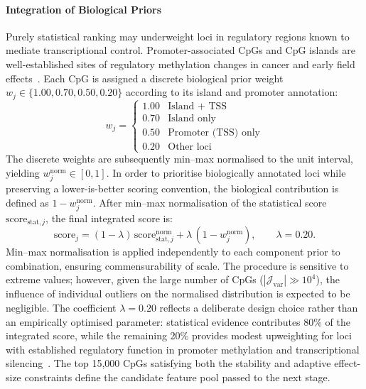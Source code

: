 \paragraph{Integration of Biological Priors}

Purely statistical ranking may underweight loci in 
regulatory regions known to mediate transcriptional 
control. Promoter-associated CpGs and CpG islands are 
well-established sites of regulatory methylation changes 
in cancer and early field 
effects~\cite{Hansen2011, Fleischer2017}. Each CpG is assigned a discrete biological prior weight 
$w_j \in \{1.00, 0.70, 0.50, 0.20\}$ according to its island 
and promoter annotation:
\begin{equation}
w_j =
\begin{cases}
1.00 & \text{Island + TSS} \\
0.70 & \text{Island only} \\
0.50 & \text{Promoter (TSS) only} \\
0.20 & \text{Other loci}
\end{cases}
\end{equation}
The discrete weights are subsequently min--max normalised 
to the unit interval, yielding $w_j^{\mathrm{norm}} \in [0,1]$. 
In order to prioritise biologically annotated loci while 
preserving a lower-is-better scoring convention, the 
biological contribution is defined as 
$1 - w_j^{\mathrm{norm}}$.
After min--max normalisation of the statistical score 
$\mathrm{score}_{\mathrm{stat},j}$, the final integrated score is:
\begin{equation}
\mathrm{score}_{j}
=
(1 - \lambda)\,\mathrm{score}_{\mathrm{stat},j}^{\mathrm{norm}}
+
\lambda\,(1 - w_j^{\mathrm{norm}}),
\qquad
\lambda = 0.20.
\end{equation}
Min--max normalisation is applied independently to each 
component prior to combination, ensuring commensurability 
of scale. The procedure is sensitive to extreme values; 
however, given the large number of CpGs 
($|\mathcal{J}_{\mathrm{var}}| \gg 10^4$), the influence 
of individual outliers on the normalised distribution is 
expected to be negligible.
The coefficient $\lambda = 0.20$ reflects a deliberate design 
choice rather than an empirically optimised parameter: 
statistical evidence contributes 80\% of the integrated score, 
while the remaining 20\% provides modest upweighting for loci 
with established regulatory function in promoter methylation 
and transcriptional silencing~\cite{Jones2012}. The top 15,000 CpGs 
satisfying both the stability and adaptive effect-size 
constraints define the candidate feature pool passed to the 
next stage.


